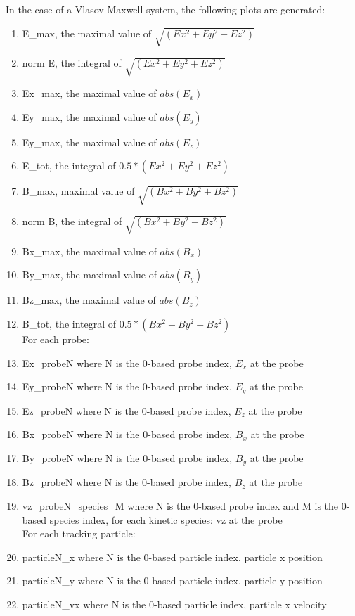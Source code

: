 \documentclass[11pt]{amsart}
\begin{document}
In the case of a Vlasov-Maxwell system, the following plots are generated:
\begin{enumerate}
\item E\_max, the maximal value of $\sqrt{(Ex^2 + Ey^2 + Ez^2)}$
\item norm E, the integral of $\sqrt{(Ex^2 + Ey^2 + Ez^2)}$
\item Ex\_max, the maximal value of $abs(E_x)$
\item Ey\_max, the maximal value of $abs(E_y)$
\item Ey\_max, the maximal value of $abs(E_z)$
\item E\_tot, the integral of $0.5*(Ex^2 + Ey^2 + Ez^2) $
\item B\_max, maximal value of $\sqrt{(Bx^2 + By^2 + Bz^2)} $
\item norm B, the integral of $\sqrt{(Bx^2 + By^2 + Bz^2) } $
\item Bx\_max, the maximal value of $abs(B_x)$
\item By\_max, the maximal value of $abs(B_y)$
\item Bz\_max, the maximal value of $abs(B_z)$
\item B\_tot, the integral of $0.5*(Bx^2 + By^2 + Bz^2) $  \\
For each probe:
\item Ex\_probeN where N is the 0-based probe index, $E_x$ at the probe
\item Ey\_probeN where N is the 0-based probe index, $E_y$ at the probe
\item Ez\_probeN where N is the 0-based probe index, $E_z$ at the probe
\item Bx\_probeN where N is the 0-based probe index, $B_x$ at the probe
\item By\_probeN where N is the 0-based probe index, $B_y$ at the probe
\item Bz\_probeN where N is the 0-based probe index, $B_z$ at the probe
\item vz\_probeN\_species\_M where N is the 0-based probe index and M is the
0-based species index, for each kinetic species: vz at the probe \\
For each tracking particle:
\item particleN\_x where N is the 0-based particle index, particle x position
\item particleN\_y where N is the 0-based particle index, particle y position
\item particleN\_vx where N is the 0-based particle index, particle x velocity

\end{enumerate}
\end{document}
